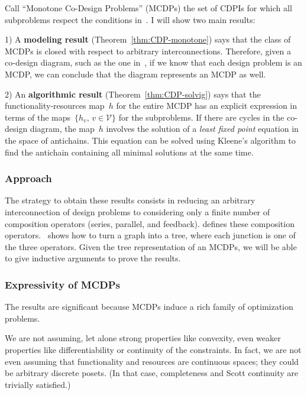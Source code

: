 \documentclass[twocolumn,english]{IEEEtran}
\theoremstyle{definition}
\theoremstyle{plain}
\theoremstyle{definition}
\theoremstyle{remark}
\theoremstyle{definition}
\theoremstyle{plain}
\theoremstyle{plain}
\newcommand{\ftor}{{h}}
\newcommand{\cdpiN}{\mathcal{V}}
\newcommand{\cdpin}{v}
\newcommand{\scottcontinuity}{Scott continuity\xspace}
\begin{document}
Call ``Monotone Co-Design Problems'' (MCDPs) the set of CDPIs for
which all subproblems respect the conditions in~.
 I will show two main results:

1) A \textbf{modeling result} (Theorem~\vref{thm:CDP-monotone})
says that the class of MCDPs is closed with respect to arbitrary interconnections.
Therefore, given a co-design diagram, such as the one in~,
if we know that each design problem is an MCDP, we can conclude that
the diagram represents an MCDP as well.

2) An \textbf{algorithmic result }(Theorem~\vref{thm:CDP-solvig})
says that the functionality-resources map~$\ftor$ for the entire
MCDP has an explicit expression in terms of the maps~$\{\ftor_{\cdpin},\,\cdpin\in\cdpiN\}$
for the subproblems. If there are cycles in the co-design diagram,
the map~$\ftor$ involves the solution of a\emph{ least fixed point}
equation in the space of antichains. This equation can be solved using
Kleene's algorithm to find the antichain containing all minimal solutions
at the same time.

\subsubsection*{Approach}

The strategy to obtain these results consists in reducing an arbitrary
interconnection of design problems to considering\emph{ }only a finite
number of composition operators (series, parallel, and feedback).
 defines these composition operators. ~shows
how to turn a graph into a tree, where each junction is one of the
three operators. Given the tree representation of an MCDPs, we will
be able to give inductive arguments to prove the results. 


\subsubsection*{Expressivity of MCDPs}

The results are significant because MCDPs induce a rich family of
optimization problems. 

We are not assuming, let alone strong properties like convexity, even
weaker properties like differentiability or continuity of the constraints.
In fact, we are not even assuming that functionality and resources
are continuous spaces; they could be arbitrary discrete posets. (In
that case, completeness and \scottcontinuity are trivially satisfied.)
\end{document}
